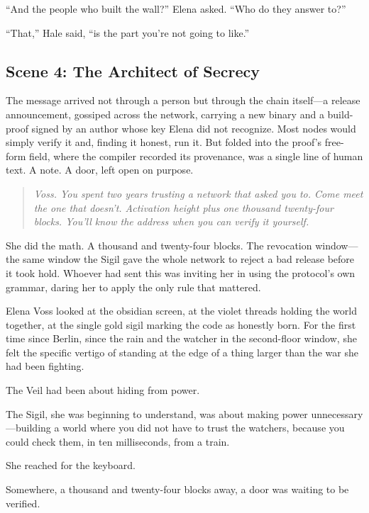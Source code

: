 ``And the people who built the wall?'' Elena asked. ``Who do they answer to?''

``That,'' Hale said, ``is the part you're not going to like.''

\hypertarget{scene-4-the-architect-of-secrecy}{%
\subsection{Scene 4: The Architect of Secrecy}\label{scene-4-the-architect-of-secrecy}}

The message arrived not through a person but through the chain itself---a release announcement, gossiped across the network, carrying a new binary and a build-proof signed by an author whose key Elena did not recognize. Most nodes would simply verify it and, finding it honest, run it. But folded into the proof's free-form field, where the compiler recorded its provenance, was a single line of human text. A note. A door, left open on purpose.

\begin{quote}
\emph{Voss. You spent two years trusting a network that asked you to. Come meet the one that doesn't. Activation height plus one thousand twenty-four blocks. You'll know the address when you can verify it yourself.}
\end{quote}

She did the math. A thousand and twenty-four blocks. The revocation window---the same window the Sigil gave the whole network to reject a bad release before it took hold. Whoever had sent this was inviting her in using the protocol's own grammar, daring her to apply the only rule that mattered.

Elena Voss looked at the obsidian screen, at the violet threads holding the world together, at the single gold sigil marking the code as honestly born. For the first time since Berlin, since the rain and the watcher in the second-floor window, she felt the specific vertigo of standing at the edge of a thing larger than the war she had been fighting.

The Veil had been about hiding from power.

The Sigil, she was beginning to understand, was about making power unnecessary---building a world where you did not have to trust the watchers, because you could check them, in ten milliseconds, from a train.

She reached for the keyboard.

Somewhere, a thousand and twenty-four blocks away, a door was waiting to be verified.

